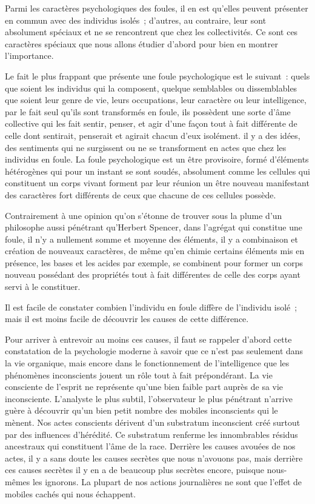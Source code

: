 \documentclass[french,twoside]{book} %
\begin{document}
Parmi les caractères psychologiques des foules, il en est qu’elles peuvent présenter en commun avec des individus isolés ; d’autres, au contraire, leur sont absolument spéciaux et ne se rencontrent que chez les collectivités. Ce sont ces caractères spé­ciaux que nous allons étudier d’abord pour bien en montrer l’importance.\par
Le fait le plus frappant que présente une foule psychologique est le suivant : quels que soient les individus qui la composent, quelque semblables ou dissemblables que soient leur genre de vie, leurs occupations, leur caractère ou leur intelligence, par le fait seul qu’ils sont transformés en foule, ils possèdent une sorte d’âme collective qui les fait sentir, penser, et agir d’une façon tout à fait différente de celle dont senti­rait, penserait et agirait chacun d’eux isolément. il y a des idées, des sentiments qui ne surgissent ou ne se transforment en actes que chez les individus en foule. La foule psychologique est un être provisoire, formé d’éléments hétérogènes qui pour un instant se sont soudés, absolument comme les cellules qui constituent un corps vivant forment par leur réunion un être nouveau manifestant des caractères fort différents de ceux que chacune de ces cellules possède.\par
Contrairement à une opinion qu’on s’étonne de trouver sous la plume d’un philoso­phe aussi pénétrant qu’Herbert Spencer, dans l’agrégat qui constitue une foule, il n’y a nullement somme et moyenne des éléments, il y a combinaison et création de nou­veaux caractères, de même qu’en chimie certains éléments mis en présence, les bases et les acides par exemple, se combinent pour former un corps nouveau possédant des propriétés tout à fait différentes de celle des corps ayant servi à le constituer.\par
Il est facile de constater combien l’individu en foule diffère de l’individu isolé ; mais il est moins facile de découvrir les causes de cette différence.\par
Pour arriver à entrevoir au moins ces causes, il faut se rappeler d’abord cette constatation de la psychologie moderne à savoir que ce n’est pas seulement dans la vie organique, mais encore dans le fonctionnement de l’intelligence que les phénomè­nes inconscients jouent un rôle tout à fait prépondérant. La vie consciente de l’esprit ne représente qu’une bien faible part auprès de sa vie inconsciente. L’analyste le plus subtil, l’observateur le plus pénétrant n’arrive guère à découvrir qu’un bien petit nom­bre des mobiles inconscients qui le mènent. Nos actes conscients dérivent d’un substratum inconscient créé surtout par des influences d’hérédité. Ce substratum ren­ferme les innombrables résidus ancestraux qui constituent l’âme de la race. Derrière les causes avouées de nos actes, il y a sans doute les causes secrètes que nous n’avouons pas, mais derrière ces causes secrètes il y en a de beaucoup plus secrètes encore, puisque nous-mêmes les ignorons. La plupart de nos actions journalières ne sont que l’effet de mobiles cachés qui nous échappent.\par
\end{document}
